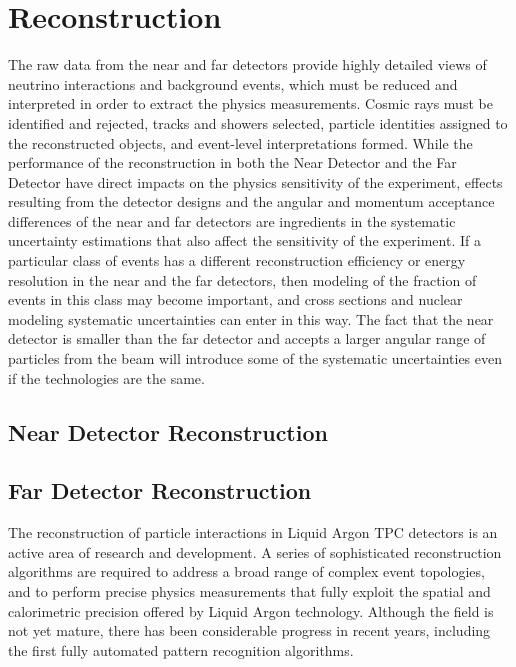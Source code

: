 \chapter{Reconstruction}
\label{annex:detectors-sc-physics-software-reconstruction}

The raw data from the near and far detectors provide highly detailed views of neutrino
interactions and background events, which must be reduced and interpreted in order to
extract the physics measurements.  Cosmic rays must be identified and rejected, tracks and
showers selected, particle identities assigned to the reconstructed objects, and event-level
interpretations formed.  While the performance of the reconstruction in both the Near Detector
and the Far Detector have direct impacts on the physics sensitivity of the experiment, effects
resulting from the detector designs and the angular and momentum acceptance differences of the
near and far detectors are ingredients in the systematic uncertainty estimations that also
affect the sensitivity of the experiment.  If a particular class of events has a different
reconstruction efficiency or energy resolution in the near and the far detectors, then modeling of the fraction of events
in this class may become important, and cross sections and nuclear modeling systematic uncertainties
can enter in this way.  The fact that the near detector is smaller than the far detector and accepts a larger
angular range of particles from the beam will introduce some of the systematic uncertainties even if the
technologies are the same. 

\section{Near Detector Reconstruction}
\label{annex:detectors-sc-physics-software-reconstruction-nd}


\section{Far Detector Reconstruction}
\label{annex:detectors-sc-physics-software-reconstruction-fd}

The reconstruction of particle interactions in Liquid Argon TPC
detectors is an active area of research and development.
A series of sophisticated reconstruction algorithms are required to
address a broad range of complex event topologies, and to perform
precise physics measurements that fully exploit the spatial and 
calorimetric precision offered by Liquid Argon technology.
Although the field is not yet mature, there has been considerable
progress in recent years, including the first fully automated
pattern recognition algorithms. 

